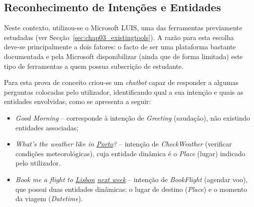 \subsection{Reconhecimento de Intenções e Entidades}
Neste contexto, utilizou-se o Microsoft LUIS, uma das ferramentas previamente estudadas (ver Secção~\ref{sec:chap03_existingtools}). A razão para esta escolha deve-se principalmente a dois fatores: o facto de ser uma plataforma bastante documentada e pela Microsoft disponibilizar (ainda que de forma limitada) este tipo de ferramentas a quem possua subscrição de estudante. 

Para esta prova de conceito criou-se um \textit{chatbot} capaz de responder a algumas perguntas colocadas pelo utilizador, identificando qual a sua intenção e quais as entidades envolvidas, como se apresenta a seguir:
%
\begin{itemize}
    \item
    {
        \textit{Good Morning} -- corresponde à intenção de \textit{Greeting} (saudação), não existindo entidades associadas;
    }
    \item
    {
        \textit{What's the weather like in \underline{Porto}?} -- intenção de \textit{CheckWeather} (verificar condições meteorológicas), cuja entidade dinâmica é o \textit{Place} (lugar) indicado pelo utilizador.
    }
    \item
    {
        \textit{Book me a flight to \underline{Lisbon} \underline{next week}} -- intenção de \textit{BookFlight} (agendar voo), que possui duas entidades dinâmicas: o lugar de destino (\textit{Place}) e o momento da viagem (\textit{Datetime}).
    }
\end{itemize}

% 

